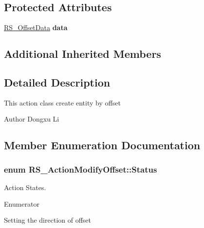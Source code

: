 \subsection*{Protected Attributes}
\begin{DoxyCompactItemize}
\item 
\hypertarget{classRS__ActionModifyOffset_a2132d924ddf59c90aab48d1566eeafed}{\hyperlink{classRS__OffsetData}{R\-S\-\_\-\-Offset\-Data} {\bfseries data}}\label{classRS__ActionModifyOffset_a2132d924ddf59c90aab48d1566eeafed}

\end{DoxyCompactItemize}
\subsection*{Additional Inherited Members}


\subsection{Detailed Description}
This action class create entity by offset

\begin{DoxyAuthor}{Author}
Dongxu Li 
\end{DoxyAuthor}


\subsection{Member Enumeration Documentation}
\hypertarget{classRS__ActionModifyOffset_a0c918df3c30f787f7ee634910306e9fa}{
\subsubsection[{Status}]{\setlength{\rightskip}{0pt plus 5cm}enum {\bf R\-S\-\_\-\-Action\-Modify\-Offset\-::\-Status}}}\label{classRS__ActionModifyOffset_a0c918df3c30f787f7ee634910306e9fa}
Action States. \begin{Desc}
\item[Enumerator]\par
\begin{description}
\item[{\em 
\hypertarget{classRS__ActionModifyOffset_a0c918df3c30f787f7ee634910306e9faaf0bd24afe3cba823034c304e27305431}{Set\-Position}\label{classRS__ActionModifyOffset_a0c918df3c30f787f7ee634910306e9faaf0bd24afe3cba823034c304e27305431}
}]Setting the direction of offset \end{description}
\end{Desc}


